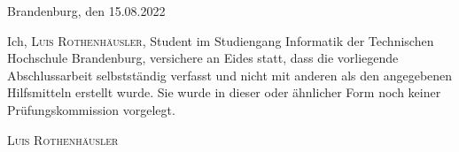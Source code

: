 \thispagestyle{empty}

\large
\begin{flushright}
  Brandenburg, den 15.08.2022
\end{flushright}

\vspace*{50mm}
Ich, {\scshape Luis Rothenhäusler}, Student im Studiengang Informatik der Technischen Hochschule Brandenburg, versichere an Eides statt, dass die vorliegende Abschlussarbeit selbstständig verfasst und nicht mit anderen als den
angegebenen Hilfsmitteln erstellt wurde.
Sie wurde in dieser oder ähnlicher Form noch keiner Prüfungskommission vorgelegt.

\vspace*{50mm}

\begin{flushright}
  {\scshape Luis Rothenhäusler}
\end{flushright}

\normalsize